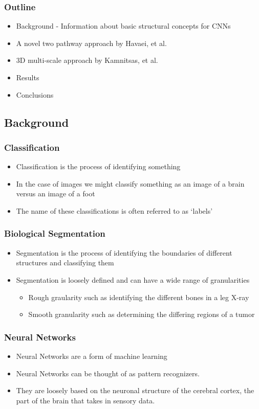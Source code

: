 \documentclass{beamer}
\begin{document}
\begin{frame}
  \frametitle{Outline}
  \tableofcontents[hideallsubsections]
  \begin{itemize}
  	\item Background - Information about basic structural concepts for CNNs
  	\item A novel two pathway approach by Havaei, et al.
  	\item 3D multi-scale approach by Kamnitsas, et al.
  	\item Results
  	\item Conclusions
  \end{itemize}
\end{frame}

\subsection*{Background}

\begin{frame}
  \frametitle{Classification}
  \begin{itemize}
	\item Classification is the process of identifying something
	\item In the case of images we might classify something as an image of a brain versus an image of a foot
	\item The name of these classifications is often referred to as `labels'
  \end{itemize}
\end{frame}

\begin{frame}
  \frametitle{Biological Segmentation}
  \begin{itemize}
	\item Segmentation is the process of identifying the boundaries of different structures and classifying them
	\item Segmentation is loosely defined and can have a wide range of granularities
	\begin{itemize}
	  \item Rough graularity such as identifying the different bones in a leg X-ray
	  \item Smooth granularity such as determining the differing regions of a tumor
	\end{itemize}
  \end{itemize}
\end{frame}

\begin{frame}
  \frametitle{Neural Networks}
  \begin{itemize}
	\item Neural Networks are a form of machine learning
	\item Neural Networks can be thought of as pattern recognizers.
	\item They are loosely based on the neuronal structure of the cerebral cortex, the part of the brain that takes in sensory data.
  \end{itemize}
\end{frame}
\end{document}

